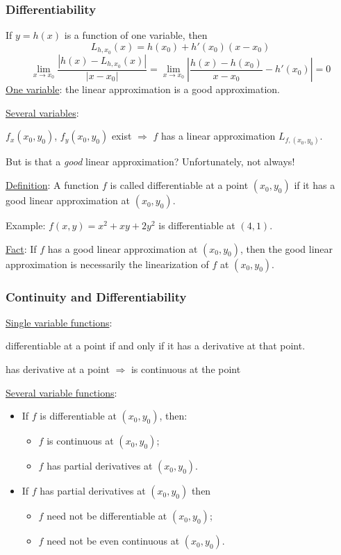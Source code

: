 \begin{frame}
  \frametitle{Differentiability}

If $y=h(x)$ is a function of one variable, then
%
$$L_{h,x_0}(x) = h(x_0) + h'(x_0) (x-x_0)$$
%
$$
  \lim_{x\to x_0} \frac{|h(x)-L_{h,x_0}(x)|}{|x-x_0|} = \lim_{x \to x_0} \left| \frac{h(x)-h(x_0)}{x-x_0} -h'(x_0) \right| = 0
$$
%
\pause \underline{One variable}: the linear approximation is a good approximation.

\pause \underline{Several variables}:

$f_x(x_0,y_0)$, $f_y(x_0,y_0)$ exist $\Longrightarrow$
$f$ has a linear approximation $L_{f, (x_0,y_0)}$.

But is that a \emph{good} linear approximation? \pause
Unfortunately, \textcolor[rgb]{0.98,0.00,0.00}{not always}!

\medskip

\pause \underline{Definition}: A function $f$ is called \textcolor[rgb]{0.98,0.00,0.00}{differentiable at a point} $(x_0,y_0)$ if it has a good linear approximation at $(x_0,y_0)$.

\medskip

\pause Example: $f(x,y) = x^2+xy+2y^2$ is differentiable at $(4,1)$.

\medskip

\pause \underline{Fact}: If $f$ has a good linear approximation at $(x_0,y_0)$, then the good linear approximation is necessarily the linearization of $f$ at $(x_0,y_0)$.
\end{frame}



\begin{frame}
  \frametitle{Continuity and Differentiability}

  \underline{Single variable functions}:

  differentiable at a point if and only if it has a derivative at that point.

  \medskip

  has derivative at a point $\Longrightarrow$ is continuous at the point
  \bigskip

\pause   \underline{Several variable functions}:

\begin{itemize}
  \item If $f$ is differentiable at $(x_0,y_0)$, then:
  \begin{itemize}
    \item $f$ is continuous at $(x_0,y_0)$;
    \item $f$ has partial derivatives at $(x_0,y_0)$.
  \end{itemize}
  \item  If $f$ has partial derivatives at $(x_0,y_0)$ then
  \begin{itemize}
    \item $f$ \textcolor[rgb]{0.98,0.00,0.00}{need not} be differentiable at $(x_0,y_0)$;
    \item $f$ \textcolor[rgb]{0.98,0.00,0.00}{need not be even continuous} at $(x_0,y_0)$.
  \end{itemize}
\end{itemize}
\end{frame}



